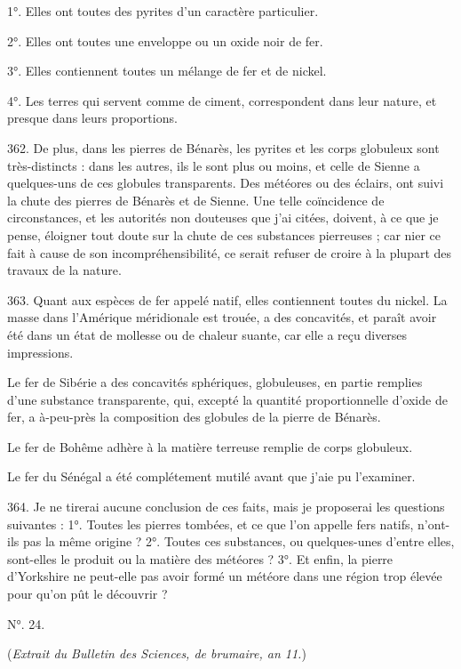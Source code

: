\documentclass[a4paper, 11pt, oneside, polutonikogreek, french]{article}
\begin{document}
1°. Elles ont toutes des pyrites d'un caractère particulier.

2°. Elles ont toutes une enveloppe ou un oxide noir de fer.

3°. Elles contiennent toutes un mélange de fer et de nickel.

4°. Les terres qui servent comme de ciment, correspondent dans leur nature, et presque dans leurs proportions.

362. De plus, dans les pierres de Bénarès, les pyrites et les corps globuleux sont très-distincts : dans les autres, ils le sont plus ou moins, et celle de Sienne a quelques-uns de ces globules transparents. Des météores ou des éclairs, ont suivi la chute des pierres de Bénarès et de Sienne. Une telle coïncidence de circonstances, et les autorités non douteuses que j'ai citées, doivent, à ce que je pense, éloigner tout doute sur la chute de ces substances pierreuses ; car nier ce fait à cause de son incompréhensibilité, ce serait refuser de croire à la plupart des travaux de la nature.

363. Quant aux espèces de fer appelé natif, elles contiennent toutes du nickel. La masse dans l'Amérique méridionale est trouée, a des concavités, et paraît avoir été dans un état de mollesse ou de chaleur suante, car elle a reçu diverses impressions.

Le fer de Sibérie a des concavités sphériques, globuleuses, en partie remplies d'une substance transparente, qui, excepté la quantité proportionnelle d'oxide de fer, a à-peu-près la composition des globules de la pierre de Bénarès.

Le fer de Bohême adhère à la matière terreuse remplie de corps globuleux.

Le fer du Sénégal a été complétement mutilé avant que j'aie pu l'examiner.

364. Je ne tirerai aucune conclusion de ces faits, mais je proposerai les questions suivantes : 1°. Toutes les pierres tombées, et ce que l'on appelle fers natifs, n'ont-ils pas la même origine ? 2°. Toutes ces substances, ou quelques-unes d'entre elles, sont-elles le produit ou la matière des météores ? 3°. Et enfin, la pierre d'Yorkshire ne peut-elle pas avoir formé un météore dans une région trop élevée pour qu'on pût le découvrir ?

\begin{center}
N°. 24.
\end{center}

(\emph{Extrait du Bulletin des Sciences, de brumaire, an 11.})
\end{document}
